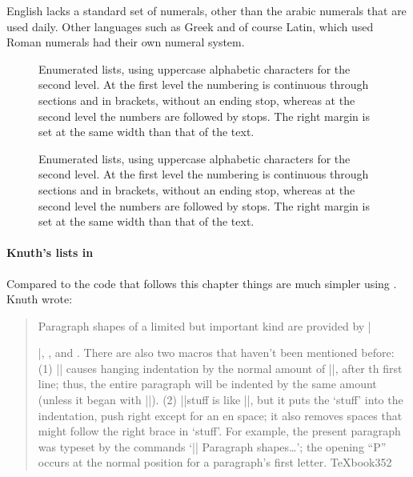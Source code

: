 English lacks a standard set of numerals, other than the arabic numerals that are used daily. Other languages such as Greek and of course Latin, which used Roman numerals  had their own numeral system.  

\begin{figure}
\centering
\fboxrule=2pt
 \caption{Enumerated lists, using uppercase alphabetic characters for the second level. At the first level the numbering is continuous through sections and in brackets, without an ending stop, whereas at the second level the numbers are followed by stops. The right margin is set at the same width than that of the text.}
 \label{fig:woodard}
\end{figure}

\begin{figure}
\centering
\fboxrule=2pt
 \caption{Enumerated lists, using uppercase alphabetic characters for the second level. At the first level the numbering is continuous through sections and in brackets, without an ending stop, whereas at the second level the numbers are followed by stops. The right margin is set at the same width than that of the text.}
 \label{fig:woodard}
\end{figure}

\paragraph{Knuth's lists in \PlainTeX}

Compared to the code that follows this chapter things are much simpler using \PlainTeX. Knuth
wrote:

\begin{quote}
Paragraph shapes of a limited but important kind are provided by |\item|,
, and . There are also two macros that haven't been mentioned
before: (1) |\hang| causes hanging indentation by the normal amount of |\parindent|,
after th first line; thus, the entire paragraph will be indented by the same amount
(unless it began with |\noindent|). (2) |\textindent|{stuff} is like |\indent|, but it puts
the `stuff' into the indentation, push right except for an en space; it also removes spaces
that might follow the right brace in `{stuff}'. For example, the present paragraph
was typeset by the commands `|\textindent{$\bullet$}| Paragraph shapes\ldots'; the
opening \enquote{P} occurs at the normal position for a paragraph's first letter. TeXbook{352}
\end{quote}

